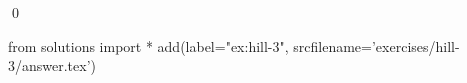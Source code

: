 
\begin{ex} 
  \label{ex:hill-3}
  
  \qed
\end{ex} 
\begin{python0}
from solutions import *
add(label="ex:hill-3",
    srcfilename='exercises/hill-3/answer.tex') 
\end{python0}
